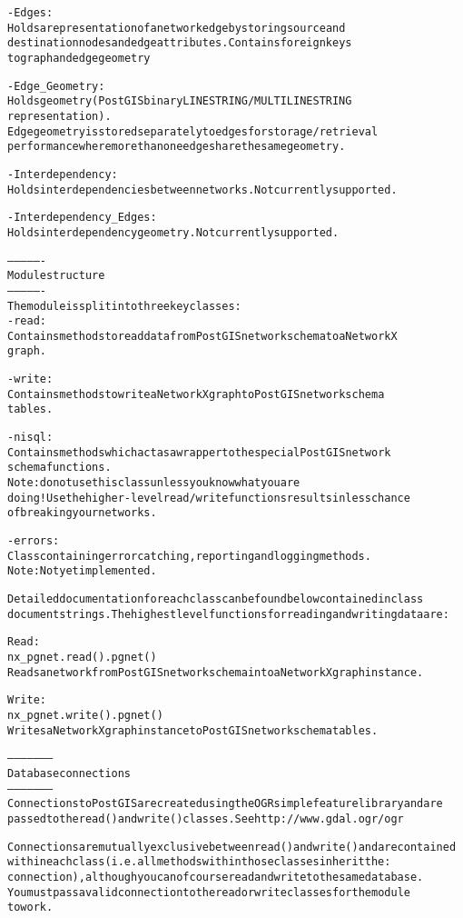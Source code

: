 \begin{alltt}
    - Edges:
        Holds a representation of a network edge by storing source and
        destination nodes and edge attributes. Contains foreign keys 
        to graph and edge geometry

    - Edge\_Geometry:
        Holds geometry (PostGIS binary LINESTRING/MULTILINESTRING 
        representation).
        Edge geometry is stored separately to edges for storage/retrieval 
        performance where more than one edge share the same geometry.
        
    - Interdependency:
        Holds interdependencies between networks. Not currently supported.
        
    - Interdependency\_Edges:
        Holds interdependency geometry. Not currently supported.

----------------
Module structure    
----------------
The module is split into three key classes:
    - read:
        Contains methods to read data from PostGIS network schema to a NetworkX 
        graph.
        
    - write:
        Contains methods to write a NetworkX graph to PostGIS network schema 
        tables.
        
    - nisql:
        Contains methods which act as a wrapper to the special PostGIS network 
        schema functions. 
        Note: do not use this class unless you know what you are
        doing! Use the higher-level read/write functions results in less chance
        of breaking your networks.
        
    - errors:
        Class containing error catching, reporting and logging methods. 
        Note: Not yet implemented.

Detailed documentation for each class can be found below contained in class 
document strings. The highest level functions for reading and writing data are:

    Read:    
    nx\_pgnet.read().pgnet()
    Reads a network from PostGIS network schema into a NetworkX graph instance.
    
    Write:
    nx\_pgnet.write().pgnet()
    Writes a NetworkX graph instance to PostGIS network schema tables.
    
--------------------
Database connections
--------------------
Connections to PostGIS are created using the OGR simple feature library and are
passed to the read() and write() classes. See http://www.gdal.ogr/ogr

Connections are mutually exclusive between read() and write() and are contained 
within each class (i.e. all methods within those classes inherit the :
connection), although you can of course read and write to the same database. 
You must pass a valid connection to the read or write classes for the module 
to work.


\end{alltt}
